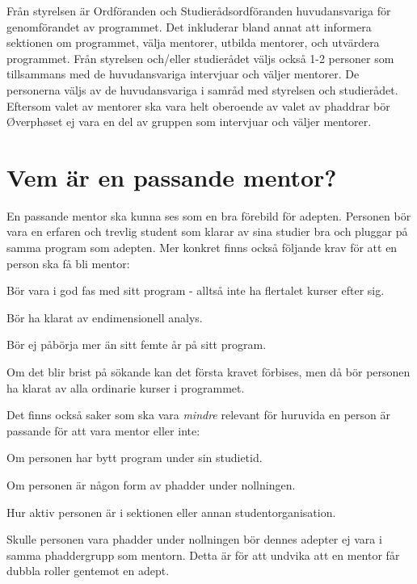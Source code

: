 \documentclass[10pt]{article}
\begin{document}
    Från styrelsen är Ordföranden och Studierådsordföranden huvudansvariga för genomförandet av programmet.
    Det inkluderar bland annat att informera sektionen om programmet, välja mentorer, utbilda mentorer, och utvärdera programmet.
    Från styrelsen och/eller studierådet väljs också 1-2 personer som tillsammans med de huvudansvariga intervjuar och väljer mentorer.
    De personerna väljs av de huvudansvariga i samråd med styrelsen och studierådet.
    Eftersom valet av mentorer ska vara helt oberoende av valet av phaddrar bör \O verph\o set ej vara en del av gruppen som intervjuar och väljer mentorer.

    \section{Vem är en passande mentor?}
    En passande mentor ska kunna ses som en bra förebild för adepten.
    Personen bör vara en erfaren och trevlig student som klarar av sina studier bra och pluggar på samma program som adepten.
    Mer konkret finns också följande krav för att en person ska få bli mentor:
    \begin{dashlist}
        \item Bör vara i god fas med sitt program - alltså inte ha flertalet kurser efter sig.
        \item Bör ha klarat av endimensionell analys.
        \item Bör ej påbörja mer än sitt femte år på sitt program.
    \end{dashlist}

    Om det blir brist på sökande kan det första kravet förbises, men då bör personen ha klarat av alla ordinarie kurser i programmet.

    Det finns också saker som ska vara \emph{mindre} relevant för huruvida en person är passande för att vara mentor eller inte:
    \begin{dashlist}
        \item Om personen har bytt program under sin studietid.
        \item Om personen är någon form av phadder under nollningen.
        \item Hur aktiv personen är i sektionen eller annan studentorganisation.
    \end{dashlist}

    Skulle personen vara phadder under nollningen bör dennes adepter ej vara i samma phaddergrupp som mentorn.
    Detta är för att undvika att en mentor får dubbla roller gentemot en adept.
\end{document}

